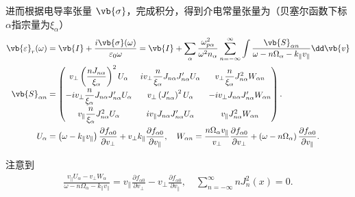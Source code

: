 进而根据电导率张量 \(\vb{\sigma}\)，完成积分，得到介电常量张量为（贝塞尔函数下标\(\alpha\)指宗量为\(\xi_\alpha\)）
\begin{align*}
	\vb{\varepsilon}_r(\omega) &= \vb{I} + \frac{i\vb{\sigma}(\omega)}{\varepsilon_0 \omega} = \vb{I} + \sum_\alpha \frac{\omega_{p\alpha}^2}{\omega^2 n_\alpha}\sum_{n=-\infty}^{\infty}\int\frac{\vb{S}_{\alpha n}}{\omega-n\Omega_\alpha-k_\parallel v_\parallel}\dd \vb{v}\\
	\vb{S}_{\alpha n}&=
	\begin{pmatrix}
		v_\perp\left( \dfrac{nJ_{n\alpha}}{\xi_\alpha} \right)^2 U_\alpha & i v_\perp \dfrac{n}{\xi_\alpha}J_{n\alpha}J_{n\alpha}'U_\alpha & v_\perp \dfrac{n}{\xi_\alpha}J_{n\alpha}^2 W_{\alpha n} \\[8pt]
		-i v_\perp \dfrac{n}{\xi_\alpha}J_{n\alpha}J_{n\alpha}'U_\alpha   & v_\perp \left( J_{n\alpha}' \right)^2 U_\alpha                 & -i v_\perp J_{n\alpha}J_{n\alpha}' W_{\alpha n}         \\[8pt]
		v_\parallel \dfrac{n}{\xi_\alpha}J_{n\alpha}^2 U_\alpha           & i v_\parallel J_{n\alpha}J_{n\alpha}' U_\alpha                 & v_\parallel J_{n\alpha}^2 W_{\alpha n}
	\end{pmatrix}.\\
	U_\alpha &= \left( \omega - k_\parallel v_\parallel \right)\frac{\partial f_{\alpha0}}{\partial v_\perp} + v_\perp k_\parallel \frac{\partial f_{\alpha0}}{\partial v_\parallel}, \quad
	W_{\alpha n} = \frac{n\Omega_\alpha v_\parallel}{v_\perp}\frac{\partial f_{\alpha0}}{\partial v_\perp} + \left( \omega - n\Omega_\alpha \right)\frac{\partial f_{\alpha0}}{\partial v_\parallel}.
\end{align*}

注意到
\begin{align*}
	\frac{v_\parallel U_\alpha - v_\perp W_{\alpha}}{\omega - n\Omega_\alpha - k_\parallel v_\parallel} = v_\parallel \frac{\partial f_{\alpha0}}{\partial v_\perp} - v_\perp \frac{\partial f_{\alpha0}}{\partial v_\parallel},\quad
	\sum_{n=-\infty}^{\infty}nJ_n^2(x) = 0.
\end{align*}

